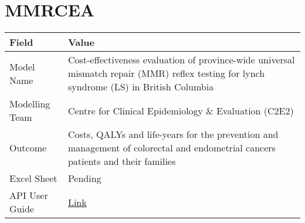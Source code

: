 \documentclass[
]{book}
\begin{document}
\hypertarget{mmrcea}{%
\chapter{MMRCEA}\label{mmrcea}}

\begin{longtable}[]{@{}ll@{}}
\toprule
\begin{minipage}[b]{0.45\columnwidth}\raggedright
Field\strut
\end{minipage} & \begin{minipage}[b]{0.49\columnwidth}\raggedright
Value\strut
\end{minipage}\tabularnewline
\midrule
\endhead
\begin{minipage}[t]{0.45\columnwidth}\raggedright
Model Name\strut
\end{minipage} & \begin{minipage}[t]{0.49\columnwidth}\raggedright
Cost-effectiveness evaluation of province-wide universal mismatch repair (MMR) reflex testing for lynch syndrome (LS) in British Columbia\strut
\end{minipage}\tabularnewline
\begin{minipage}[t]{0.45\columnwidth}\raggedright
Modelling Team\strut
\end{minipage} & \begin{minipage}[t]{0.49\columnwidth}\raggedright
Centre for Clinical Epidemiology \& Evaluation (C2E2)\strut
\end{minipage}\tabularnewline
\begin{minipage}[t]{0.45\columnwidth}\raggedright
Outcome\strut
\end{minipage} & \begin{minipage}[t]{0.49\columnwidth}\raggedright
Costs, QALYs and life-years for the prevention and management of colorectal and endometrial cancers patients and their families\strut
\end{minipage}\tabularnewline
\begin{minipage}[t]{0.45\columnwidth}\raggedright
Excel Sheet\strut
\end{minipage} & \begin{minipage}[t]{0.49\columnwidth}\raggedright
Pending\strut
\end{minipage}\tabularnewline
\begin{minipage}[t]{0.45\columnwidth}\raggedright
API User Guide\strut
\end{minipage} & \begin{minipage}[t]{0.49\columnwidth}\raggedright
\href{https://resplab.github.io/prismguide/api-users-guide.html\#mmrcea-1}{Link}\strut
\end{minipage}\tabularnewline
\bottomrule
\end{longtable}
\end{document}
